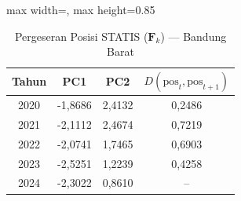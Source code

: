 \begin{table}[H]
\centering
\caption{Pergeseran Posisi STATIS ($\mathbf{F}_k$) --- Bandung Barat} \label{tab:app2jarak_statis_skor_bandung_barat}
\begin{adjustbox}{max width=\textwidth, max height=0.85\textheight}
\begin{tabular}{|c|c|c|c|}
\hline
\textbf{Tahun} & \textbf{PC1} & \textbf{PC2} & \textbf{$D(\text{pos}_t, \text{pos}_{t+1})$} \\
\hline
2020 & -1,8686 & 2,4132 & 0,2486 \\
2021 & -2,1112 & 2,4674 & 0,7219 \\
2022 & -2,0741 & 1,7465 & 0,6903 \\
2023 & -2,5251 & 1,2239 & 0,4258 \\
2024 & -2,3022 & 0,8610 & -- \\
\hline
\end{tabular}
\end{adjustbox}
\end{table}